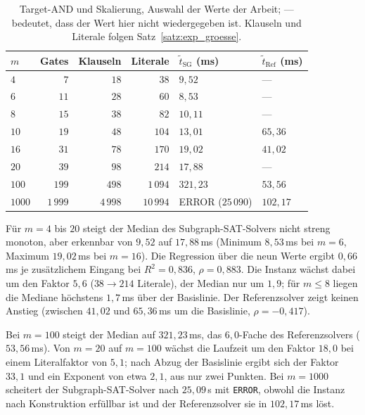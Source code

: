\begin{table}[!ht]
	\centering
	\small
	\begin{tabularx}{\textwidth}{@{}L{1.6cm}rrrYY@{}}
		\toprule
		$m$ & Gates & Klauseln & Literale & $\tilde t_{\mathrm{SG}}$ (ms) & $\tilde t_{\mathrm{Ref}}$ (ms) \\
		\midrule
		$4$ & $7$ & $18$ & $38$ & $9{,}52$ & --- \\
		$6$ & $11$ & $28$ & $60$ & $8{,}53$ & --- \\
		$8$ & $15$ & $38$ & $82$ & $10{,}11$ & --- \\
		$10$ & $19$ & $48$ & $104$ & $13{,}01$ & $65{,}36$ \\
		$16$ & $31$ & $78$ & $170$ & $19{,}02$ & $41{,}02$ \\
		$20$ & $39$ & $98$ & $214$ & $17{,}88$ & --- \\
		$100$ & $199$ & $498$ & $1\,094$ & $321{,}23$ & $53{,}56$ \\
		$1000$ & $1\,999$ & $4\,998$ & $10\,994$ & ERROR ($25\,090$) & $102{,}17$ \\
		\bottomrule
	\end{tabularx}
	\caption{Target-AND und Skalierung, Auswahl der Werte der Arbeit; \glqq---\grqq{} bedeutet, dass der Wert hier nicht wiedergegeben ist. Klauseln und Literale folgen Satz~\ref{satz:exp_groesse}.}
	\label{tab:exp_tand}
\end{table}

Für $m=4$ bis $20$ steigt der Median des Subgraph-SAT-Solvers nicht streng monoton, aber erkennbar von $9{,}52$ auf $17{,}88$\,ms (Minimum $8{,}53$\,ms bei $m=6$, Maximum $19{,}02$\,ms bei $m=16$). Die Regression über die neun Werte ergibt $0{,}66$\,ms je zusätzlichem Eingang bei $R^2=0{,}836$, $\rho=0{,}883$. Die Instanz wächst dabei um den Faktor $5{,}6$ ($38\to214$ Literale), der Median nur um $1{,}9$; für $m\le8$ liegen die Mediane höchstens $1{,}7$\,ms über der Basislinie. Der Referenzsolver zeigt keinen Anstieg (zwischen $41{,}02$ und $65{,}36$\,ms um die Basislinie, $\rho=-0{,}417$).

Bei $m=100$ steigt der Median auf $321{,}23$\,ms, das $6{,}0$-Fache des Referenzsolvers ($53{,}56$\,ms). Von $m=20$ auf $m=100$ wächst die Laufzeit um den Faktor $18{,}0$ bei einem Literalfaktor von $5{,}1$; nach Abzug der Basislinie ergibt sich der Faktor $33{,}1$ und ein Exponent von etwa $2{,}1$, aus nur zwei Punkten. Bei $m=1000$ scheitert der Subgraph-SAT-Solver nach $25{,}09$\,s mit \texttt{ERROR}, obwohl die Instanz nach Konstruktion erfüllbar ist und der Referenzsolver sie in $102{,}17$\,ms löst.

